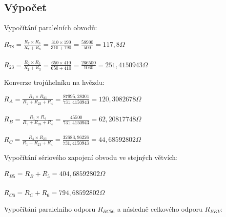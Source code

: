 \documentclass[12pt,a4paper,titlepage,final]{article}
\begin{document}

	\subsection*{Výpočet}
	
	\quad Vypočítání paralelních obvodů: \\
	
	\begin{tabbing}
		$ { \displaystyle R_{78} = \frac{R_{7} \times R_{8}}
		{R_{7} + R_{8}} = 
		\frac{310 \times 190}{310 + 190} = 
		\frac{58900}{500} = 117,8 \Omega }$ \\
		\\
		$ { \displaystyle R_{23} = \frac{R_{2} \times R_{3}}
		{R_{2} + R_{3}} =
		\frac{650 \times 410}{650 + 410} =
		\frac{266500}{1060} = 251,4150943 \Omega} $ \\
	\end{tabbing}
	
	Konverze trojúhelníku na hvězdu: \\
	
	\begin{tabbing}
		$ { \displaystyle R_{A} = \frac{R_{1} \times R_{23}} 
		{R_{1} + R_{23} + R_{4}} = 
		\frac{87995,28301}{731,4150943} = 120,3082678 \Omega}$ \\
		\\
		$ { \displaystyle R_{B} = \frac{R_{1} \times R_{4}} 
		{R_{1} + R_{23} + R_{4}} = 
		\frac{45500}{731,4150943} = 62,20817748 \Omega}$ \\
		\\
		$ { \displaystyle R_{C} = \frac{R_{4} \times R_{23}} 
		{R_{1} + R_{23} + R_{4}} = 
		\frac{32683,96226}{731,4150943} = 44,68592802 \Omega}$ \\
	\end{tabbing}
	\newpage
	Vypočítání sériového zapojení obvodu ve stejných větvích: \\
	
	\begin{tabbing}
		$ { \displaystyle R_{B5} = R_{B} + R_{5} =
		404,68592802 \Omega }$ \\
		\\
		$ { \displaystyle R_{C6} = R_{C} + R_{6} =
		794,68592802 \Omega }$ \\
	\end{tabbing}
	
	Vypočítání paralelního odporu $R_{BC56}$ a následně celkového odporu
	$R_{EKV}$: \\
	
\end{document}
